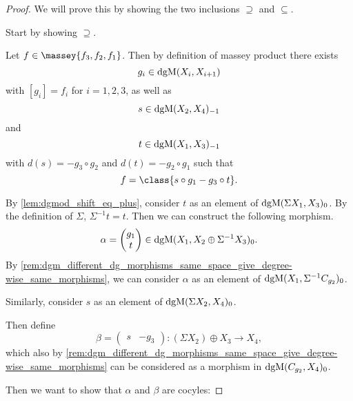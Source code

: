\begin{proof}
    We will prove this by showing the two inclusions \( \supseteq \) and \( \subseteq \).

    Start by showing \( \supseteq \).

    Let \( f \in \massey{f_3, f_2, f_1} \). Then by definition of massey product there exists
    \[
        g_i \in \operatorname{dgM}(X_i, X_{i + 1})
    \]
    with \( [g_i] = f_i \) for \( i = 1, 2, 3 \), as well as
    \[
        s \in \operatorname{dgM}(X_2, X_4)_{-1}
    \]
    and
    \[
        t \in \operatorname{dgM}(X_1, X_3)_{-1}
    \]
    with \( d(s) = - g_3 \circ g_2 \) and \( d(t) = - g_2 \circ g_1 \) such that
    \[
        f = \class{s \circ g_1 - g_3 \circ t}.
    \]

    By \autoref{lem:dgmod_shift_eq_plus}, consider \( t \) as an element of \( \operatorname{dgM}(\Sigma X_1, X_3)_0 \). By the definition of \( \Sigma \), \( \Sigma^{-1} t = t \). Then we can construct the following morphism.
    \[
        \alpha =
        \begin{pmatrix}
            g_1 \\
            t
        \end{pmatrix}
        \in \operatorname{dgM}(X_1, X_2 \oplus \Sigma^{-1} X_3)_0.
    \]
    By \autoref{rem:dgm_different_dg_morphisms_same_space_give_degree-wise_same_morphisms}, we can consider \( \alpha \) as an element of \( \operatorname{dgM}(X_1, \Sigma^{-1} C_{g_2})_0 \).

    Similarly, consider \( s \) as an element of \( \operatorname{dgM}(\Sigma X_2, X_4)_0 \).

    Then define
    \[
        \beta =
        \begin{pmatrix}
            s & -g_3
        \end{pmatrix}
        : (\Sigma X_2) \oplus X_3 \to X_4,
    \]
    which also by \autoref{rem:dgm_different_dg_morphisms_same_space_give_degree-wise_same_morphisms} can be considered as a morphism in \( \operatorname{dgM}(C_{g_2}, X_4)_0 \).

    Then we want to show that \( \alpha \) and \( \beta \) are cocyles:


\end{proof}

